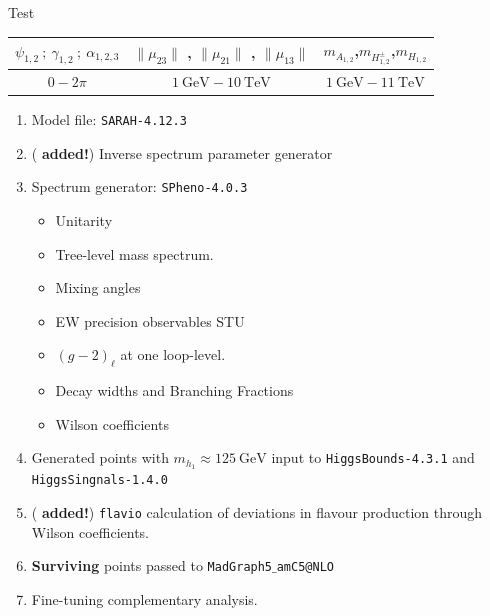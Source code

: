 \documentclass[10pt,xcolor=dvipsnames,mathserif]{beamer}
\newcommand{\blue}[0]{\color{blue}}
\newcommand{\green}[0]{\color{ForestGreen}}
\begin{document}

\begin{frame}{Test}
        \begin{table}[hb]
	    \centering
	    \begin{tabular}{ccc}
		$\psi_{1,2} \ ; \ \gamma_{1,2} \ ;\  \alpha_{1,2,3}$ & $\|\mu_{23}\|$ , $\|\mu_{21}\|$ , $\|\mu_{13}\|$ &  $m_{A_{1,2}}$,$m_{H_{1,2}^\pm}$,$m_{H_{1,2}}$ \\ \hline
		$0- 2\pi$    & $1 \ \text{GeV} - 10 \ \text{TeV}$ & $1 \ \text{GeV} - 11 \ \text{TeV}$   
	    \end{tabular}
		\end{table} 
		\begin{enumerate}
			\item Model file: \texttt{SARAH-4.12.3}
			\item { \green ( \textbf{added!})}  Inverse spectrum parameter generator 
			\item Spectrum generator: \texttt{SPheno-4.0.3}
			\begin{itemize}
				\item Unitarity
				\item {\blue Tree-level mass spectrum.}
				\item Mixing angles
				\item EW precision observables STU
				\item $\left(g-2\right)_\ell$ at one loop-level. 
				\item Decay widths and Branching Fractions
				\item {\blue Wilson coefficients}
			\end{itemize}
			\item Generated points with $m_{h_1} \approx 125 ~\mathrm{GeV}$ input to \texttt{HiggsBounds-4.3.1} and  \texttt{HiggsSingnals-1.4.0}
			\item { \green ( \textbf{added!})} \texttt{flavio} calculation of deviations in flavour production through Wilson coefficients.
			\item \textbf{Surviving} points passed to \texttt{MadGraph5$\_$amC5@NLO}
			\item Fine-tuning complementary analysis. 
		\end{enumerate}
\end{frame}
\end{document}
